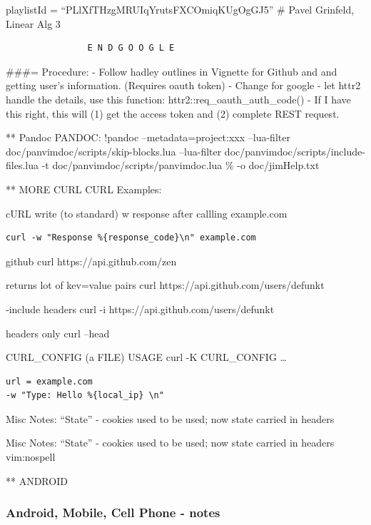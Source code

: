\documentclass[
  letterpaper,
  DIV=11,
  numbers=noendperiod]{scrartcl}
\begin{document}
playlistId = ``PLlXfTHzgMRUIqYrutsFXCOmiqKUgOgGJ5'' \# Pavel Grinfeld,
Linear Alg 3

\begin{verbatim}
                E N D G O O G L E
\end{verbatim}

\#\#\#= Procedure: - Follow hadley outlines in Vignette for Github and
and getting user's information. (Requires oauth token) - Change for
google - let httr2 handle the details, use this function:
httr2::req\_oauth\_auth\_code() - If I have this right, this will (1)
get the access token and (2) complete REST request.

** Pandoc PANDOC: !pandoc --metadata=project:xxx --lua-filter
doc/panvimdoc/scripts/skip-blocks.lua --lua-filter
doc/panvimdoc/scripts/include-files.lua -t
doc/panvimdoc/scripts/panvimdoc.lua \% -o doc/jimHelp.txt

** MORE CURL CURL Examples:

cURL write (to standard) w response after callling example.com

\begin{verbatim}
curl -w "Response %{response_code}\n" example.com
\end{verbatim}

github curl https://api.github.com/zen

returns lot of kev=value pairs curl https://api.github.com/users/defunkt

-include headers curl -i https://api.github.com/users/defunkt

headers only curl --head

CURL\_CONFIG (a FILE) USAGE curl -K CURL\_CONFIG \ldots{}

\begin{verbatim}
url = example.com
-w "Type: Hello %{local_ip} \n"
\end{verbatim}

Misc Notes: ``State'' - cookies used to be used; now state carried in
headers

Misc Notes: ``State'' - cookies used to be used; now state carried in
headers\\
vim:nospell

** ANDROID

\subsubsection{Android, Mobile, Cell Phone -
notes}\label{android-mobile-cell-phone---notes}
\end{document}
